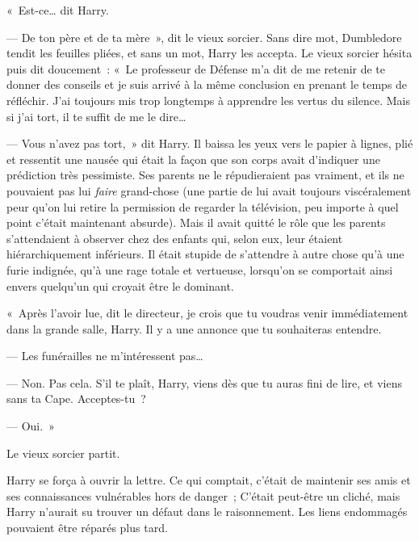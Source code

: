 «~Est-ce… dit Harry.

--- De ton père et de ta mère~», dit le vieux sorcier.
Sans dire mot, Dumbledore tendit les feuilles pliées, et sans un mot, Harry les accepta.
Le vieux sorcier hésita puis dit doucement~: «~Le professeur de Défense m'a dit de me retenir de te donner des conseils et je suis arrivé à la même conclusion en prenant le temps de réfléchir.
J'ai toujours mis trop longtemps à apprendre les vertus du silence.
Mais si j'ai tort, il te suffit de me le dire…

--- Vous n'avez pas tort,~» dit Harry.
Il baissa les yeux vers le papier à lignes, plié et ressentit une nausée qui était la façon que son corps avait d'indiquer une prédiction très pessimiste.
Ses parents ne le répudieraient pas vraiment, et ils ne pouvaient pas lui \emph{faire} grand-chose (une partie de lui avait toujours viscéralement peur qu'on lui retire la permission de regarder la télévision, peu importe à quel point c'était maintenant absurde).
Mais il avait quitté le rôle que les parents s'attendaient à observer chez des enfants qui, selon eux, leur étaient hiérarchiquement inférieurs.
Il était stupide de s'attendre à autre chose qu'à une furie indignée, qu'à une rage totale et vertueuse, lorsqu'on se comportait ainsi envers quelqu'un qui croyait être le dominant.

«~Après l'avoir lue, dit le directeur, je crois que tu voudras venir immédiatement dans la grande salle, Harry.
Il y a une annonce que tu souhaiteras entendre.

--- Les funérailles ne m'intéressent pas…

--- Non.
Pas cela.
S'il te plaît, Harry, viens dès que tu auras fini de lire, et viens sans ta Cape.
Acceptes-tu~?

--- Oui.~»

Le vieux sorcier partit.

Harry se força à ouvrir la lettre.
Ce qui comptait, c'était de maintenir ses amis et ses connaissances vulnérables hors de danger~; C'était peut-être un cliché, mais Harry n'aurait su trouver un défaut dans le raisonnement.
Les liens endommagés pouvaient être réparés plus tard.


